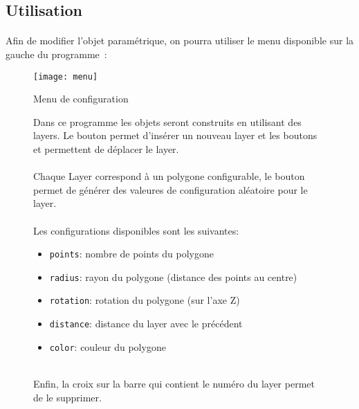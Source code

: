 \documentclass[article, backcover, french, nodocumentinfo]{upmethodology-document}
\begin{document}
		\subsection{Utilisation}
			\paragraph*{}
				Afin de modifier l'objet paramétrique, on pourra utiliser le menu disponible sur la gauche du programme~: \\
				\begin{minipage}[c]{0.4\textwidth}
					\begin{figure}[H]
						\centering%
						\texttt{[image: menu]}%
						\caption{Menu de configuration}%
						\label{fig:menu}%
					\end{figure}
				\end{minipage}
				\begin{minipage}[c]{0.59\textwidth}
					\begin{figure}[H]
						Dans ce programme les objets seront construits en utilisant des layers. Le bouton \fbox{\texttt{+}} permet d’insérer un nouveau layer et les boutons \fbox{$\blacktriangle$} et \fbox{$\blacktriangledown$} permettent de déplacer le layer.\\
						\hfill \\
						Chaque Layer correspond à un polygone configurable, le bouton  permet de générer des valeures de configuration aléatoire pour le layer.\\
						\hfill \\
						Les configurations disponibles sont les suivantes:
						\begin{itemize}
							\item \texttt{points}: nombre de points du polygone
							\item \texttt{radius}: rayon du polygone (distance des points au centre)
							\item \texttt{rotation}: rotation du polygone (sur l'axe Z)
							\item \texttt{distance}: distance du layer avec le précédent
							\item \texttt{color}: couleur du polygone
						\end{itemize}
						\hfill \\
						Enfin, la croix sur la barre qui contient le numéro du layer permet de le supprimer.
					\end{figure}
				\end{minipage}
\end{document}
